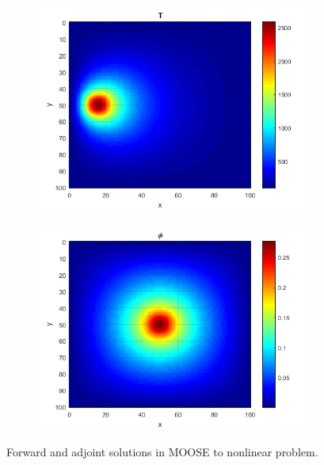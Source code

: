 \documentclass{article}
\begin{document}
\begin{figure}[H]
\label{sol1}
\centering
\begin{subfigure}{.5\textwidth}
  \centering
  \includegraphics[width=.98\linewidth]{nonlinearT.png}
  \label{fig:sfig1}
\end{subfigure}%
\begin{subfigure}{.5\textwidth}
  \centering
  \includegraphics[width=.98\linewidth]{nonlinearphi.png}
  \label{fig:sfig4}
\end{subfigure}%
\caption{Forward and adjoint solutions in MOOSE to nonlinear problem.}
\end{figure}
\end{document}
